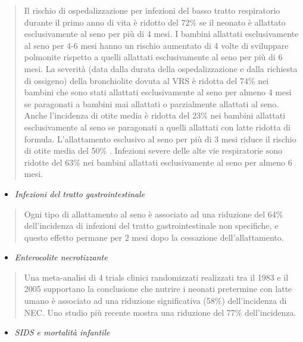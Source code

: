 \documentclass[]{article}
\begin{document}
\begin{quote}
Il rischio di ospedalizzazione per infezioni del basso tratto
respiratorio durante il primo anno di vita è ridotto del 72\% se il
neonato è allattato esclusivamente al seno per più di 4 mesi. I bambini
allattati esclusivamente al seno per 4-6 mesi hanno un rischio aumentato
di 4 volte di sviluppare polmonite rispetto a quelli allattati
esclusivamente al seno per più di 6 mesi. La severità (data dalla durata
della ospedalizzazione e dalla richiesta di ossigeno) della bronchiolite
dovuta al VRS è ridotta del 74\% nei bambini che sono stati allattati
esclusivamente al seno per almeno 4 mesi se paragonati a bambini mai
allattati o parzialmente allattati al seno. Anche l'incidenza di otite
media è ridotta del 23\% nei bambini allattati esclusivamente al seno se
paragonati a quelli allattati con latte ridotta di formula.
L'allattamento esclusivo al seno per più di 3 mesi riduce il rischio di
otite media del 50\% . Infezioni severe delle alte vie respiratorie sono
ridotte del 63\% nei bambini allattati esclusivamente al seno per almeno
6 mesi.
\end{quote}

\begin{itemize}
\item
  \emph{Infezioni del tratto gastrointestinale}
\end{itemize}

\begin{quote}
Ogni tipo di allattamento al seno è associato ad una riduzione del 64\%
dell'incidenza di infezioni del tratto gastrointestinale non specifiche,
e questo effetto permane per 2 mesi dopo la cessazione
dell'allattamento.
\end{quote}

\begin{itemize}
\item
  \emph{Enterocolite necrotizzante}
\end{itemize}

\begin{quote}
Una meta-analisi di 4 trials clinici randomizzati realizzati tra il 1983
e il 2005 supportano la conclusione che nutrire i neonati pretermine con
latte umano è associato ad una riduzione significativa (58\%)
dell'incidenza di NEC. Uno studio più recente mostra una riduzione del
77\% dell'incidenza.
\end{quote}

\begin{itemize}
\item
  \emph{SIDS e mortalità infantile}
\end{itemize}
\end{document}
